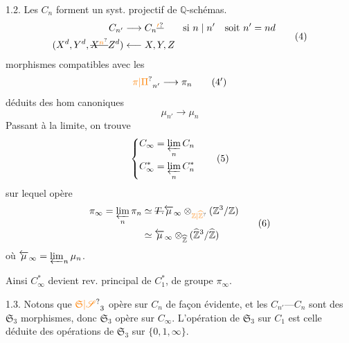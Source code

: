 1.2. Les $C_n$ forment un syst. projectif de $\mathbb Q$-schémas.
\[
\begin{aligned}
C_{n'}&\longrightarrow C_n\deleted{\unsure{'}}\qquad\text{si }n\mid n'\quad\text{soit }n'=nd\\
(X^d,Y^d,\deleted{X^{\unsure{n}}}Z^d)&\longleftarrow X,Y,Z
\end{aligned}\tag*{(4)}
\]
morphismes compatibles avec les
\[
\unsure{\pi|\Pi}_{n'}\longrightarrow\pi_n\tag*{($4'$)}
\]
déduits des hom canoniques
\[
\mu_{n'}\longrightarrow\mu_n\tag*{($4''$)}
\]
Passant à la limite, on trouve
\[
\left\{\begin{aligned}
C_\infty&=\varprojlim_n C_n\\
C_\infty^*&=\varprojlim_n C_n^*
\end{aligned}\right.\tag*{(5)}
\]
sur lequel opère
\[
\begin{aligned}
\pi_\infty=\varprojlim_n\pi_n&\simeq\deleted{T\mathbin{.}}
\overleftarrow{\mu}_\infty\otimes_{\unsure{\mathbb Z|\widehat{\mathbb Z}}}
(\mathbb Z^3/\mathbb Z)\\
&\simeq\overleftarrow{\mu}_\infty\otimes_{\widehat{\mathbb Z}}
(\widehat{\mathbb Z}^3/\widehat{\mathbb Z})
\end{aligned}\tag*{(6)}
\]
où $\overleftarrow{\mu}_\infty=\varprojlim_n\mu_n$.

Ainsi $C_\infty^*$ devient rev. principal de $C_1^*$,
de groupe $\pi_\infty$.

1.3. Notons que $\unsure{\mathfrak S|\mathscr S}_3$ opère sur $C_n$ de façon
évidente, et les $C_{n'}\text{---}C_n$ sont des $\mathfrak S_3$
morphismes, donc $\mathfrak S_3$ opère sur $C_\infty$.
L'opération de $\mathfrak S_3$ sur $C_1$  est celle
déduite des opérations de $\mathfrak S_3$ sur $\{0,1,\infty\}$.

